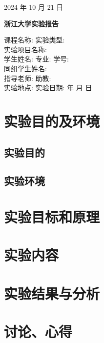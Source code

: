 \documentclass{ctexart}
\begin{document}
	\vspace{1.8cm}
	\begin{center}
		2024 年 10 月 21 日
	\end{center}
	\vspace{1cm}
	
	
	\newpage
	\begin{center}
		 \bf 浙江大学实验报告
	\end{center}
	\vspace{1cm}
	\noindent 课程名称: \underline{} 
	实验类型: \underline{} \\[0.4cm] 
	实验项目名称: \underline{} \\[0.4cm] 
	学生姓名: \underline{} 
	专业: \underline{} 
	学号: \underline{} \\[0.4cm]
	同组学生姓名: \underline{}\\[0.4cm]
	指导老师: \underline{} 
	助教: \underline{} \\[0.4cm]
	实验地点: \underline{} 
	实验日期: \underline{} 年 \underline{} 月 \underline{} 日
	
	\vspace{1.5cm}
	\graphicspath{{figures/}}
	
	\section{实验目的及环境}
	
	\subsection{实验目的}
	\subsection{实验环境}
	\section{实验目标和原理}
	
	\section{实验内容}
	
	\section{实验结果与分析}
	
	\section{讨论、心得}
	
	\enddocument
\end{document}
